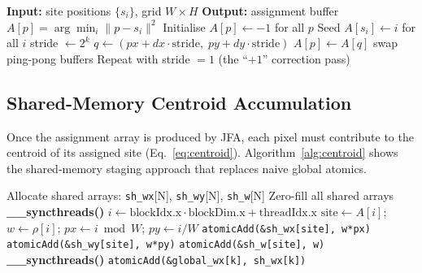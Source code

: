 \documentclass[12pt,a4paper]{article}
\begin{document}
\begin{algorithm}
\caption{GPU Jump Flooding Algorithm (1+JFA variant)}
\label{alg:jfa}
\begin{algorithmic}[1]
    \State \textbf{Input:} site positions $\{s_i\}$, grid $W \times H$
    \State \textbf{Output:} assignment buffer $A[p] = \arg\min_i \|p - s_i\|^2$
    \State Initialise $A[p] \gets -1$ for all $p$ 
    \State Seed $A[s_i] \gets i$ for all $i$   
        \State stride $\gets 2^k$
                \State $q \gets (px + dx \cdot \text{stride},\; py + dy \cdot \text{stride})$
                        \State $A[p] \gets A[q]$
                    \EndIf
                \EndIf
            \EndFor
        \EndFor
        \State swap ping-pong buffers
    \EndFor
    \State Repeat with stride $= 1$ (the ``$+1$'' correction pass)
\end{algorithmic}
\end{algorithm}

\subsection{Shared-Memory Centroid Accumulation}

Once the assignment array is produced by JFA, each pixel must contribute to
the centroid of its assigned site (Eq.~\eqref{eq:centroid}).  Algorithm~\ref{alg:centroid}
shows the shared-memory staging approach that replaces naive global atomics.

\begin{algorithm}
\caption{Block-Local Shared-Memory Centroid Accumulation}
\label{alg:centroid}
\begin{algorithmic}[1]
    \State Allocate shared arrays: \texttt{sh\_wx}[N], \texttt{sh\_wy}[N], \texttt{sh\_w}[N]
    \State Zero-fill all shared arrays 
    \State \textbf{\_\_syncthreads()}
    \State $i \gets \text{blockIdx.x} \cdot \text{blockDim.x} + \text{threadIdx.x}$
        \State $\text{site} \gets A[i]$; \; $w \gets \rho[i]$; \; $px \gets i \bmod W$; \; $py \gets i / W$
        \State \texttt{atomicAdd(\&sh\_wx[site], w*px)} 
        \State \texttt{atomicAdd(\&sh\_wy[site], w*py)}
        \State \texttt{atomicAdd(\&sh\_w[site], w)}
    \EndIf
    \State \textbf{\_\_syncthreads()}
        \State \texttt{atomicAdd(\&global\_wx[k], sh\_wx[k])} 
    \EndFor
\end{algorithmic}
\end{algorithm}
\end{document}
